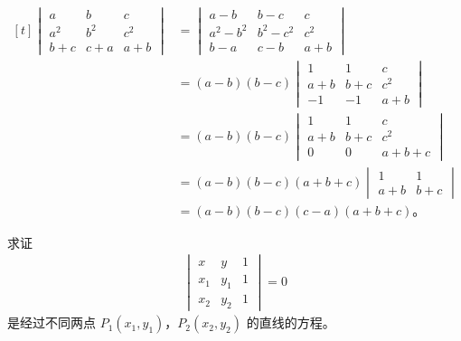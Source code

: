 \zhengming $\begin{aligned}[t]
    \begin{vmatrix}
        a     & b     & c \\
        a^2   & b^2   & c^2 \\
        b + c & c + a & a + b
    \end{vmatrix}
    &=  \begin{vmatrix}
            a - b     & b - c     & c \\
            a^2 - b^2 & b^2 - c^2 & c^2 \\
            b - a     & c - b     & a + b
        \end{vmatrix} \\
    &= (a - b)(b - c)
        \begin{vmatrix}
            1     & 1     & c \\
            a + b & b + c & c^2 \\
            -1    & -1    & a + b
        \end{vmatrix} \\
    &= (a - b)(b - c)
        \begin{vmatrix}
            1     & 1     & c \\
            a + b & b + c & c^2 \\
            0     & 0     & a + b + c
        \end{vmatrix} \\
    &= (a - b)(b - c)(a + b + c)
        \begin{vmatrix}
            1     & 1 \\
            a + b & b + c
        \end{vmatrix} \\
    &= (a - b)(b - c)(c - a)(a + b + c) \text{。}
\end{aligned}$



\liti 求证
\begin{gather*}
    \begin{vmatrix*}
        x   & y   & 1 \\
        x_1 & y_1 & 1 \\
        x_2 & y_2 & 1
    \end{vmatrix*} = 0 \tag{*}\label{eq:sjhlszk-star}
\end{gather*}
是经过不同两点 $P_1(x_1, y_1)$，$P_2(x_2, y_2)$ 的直线的方程。

